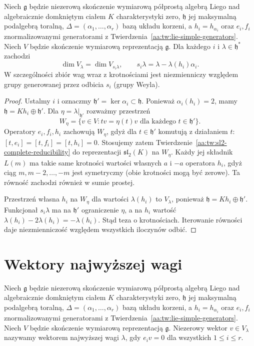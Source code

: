\begin{twierdzenie}
\label{aa:tw:lie-weight-reflection}
Niech $\mathfrak g$ będzie niezerową skończenie wymiarową półprostą algebrą Liego nad algebraicznie domkniętym ciałem $K$ charakterystyki zero, $\mathfrak h$ jej maksymalną podalgebrą toralną, $\Delta=(\alpha_1,\ldots,\alpha_r)$ bazą układu korzeni, a $h_i=h_{\alpha_i}$ oraz $e_i,f_i$ znormalizowanymi generatorami z Twierdzenia~\ref{aa:tw:lie-simple-generators}. Niech $V$ będzie skończenie wymiarową reprezentacją $\mathfrak g$. Dla każdego $i$ i $\lambda\in\mathfrak h^*$ zachodzi
\[
 \dim V_\lambda=\dim V_{s_i\lambda},
 \qquad s_i\lambda=\lambda-\lambda(h_i)\alpha_i.
\]
W szczególności zbiór wag wraz z krotnościami jest niezmienniczy względem grupy generowanej przez odbicia $s_i$ (grupy Weyla).
\end{twierdzenie}
\begin{proof}
Ustalmy $i$ i oznaczmy $\mathfrak h'=\ker\alpha_i\subset\mathfrak h$. Ponieważ $\alpha_i(h_i)=2$, mamy $\mathfrak h=Kh_i\oplus\mathfrak h'$. Dla $\eta=\lambda|_{\mathfrak h'}$ rozważmy przestrzeń
\[
 W_\eta=\{v\in V:tv=\eta(t)v\text{ dla każdego }t\in\mathfrak h'\}.
\]
Operatory $e_i,f_i,h_i$ zachowują $W_\eta$, gdyż dla $t\in\mathfrak h'$ komutują z działaniem $t$: $[t,e_i]=[t,f_i]=[t,h_i]=0$. Stosujemy zatem Twierdzenie~\ref{aa:tw:sl2-complete-reducibility} do reprezentacji $\mathfrak{sl}_2(K)$ na $W_\eta$. Każdy jej składnik $L(m)$ ma takie same krotności wartości własnych $a$ i $-a$ operatora $h_i$, gdyż ciąg $m,m-2,\ldots,-m$ jest symetryczny (obie krotności mogą być zerowe). Ta równość zachodzi również w sumie prostej.

Przestrzeń własna $h_i$ na $W_\eta$ dla wartości $\lambda(h_i)$ to $V_\lambda$, ponieważ $\mathfrak h=Kh_i\oplus\mathfrak h'$. Funkcjonał $s_i\lambda$ ma na $\mathfrak h'$ ograniczenie $\eta$, a na $h_i$ wartość $\lambda(h_i)-2\lambda(h_i)=-\lambda(h_i)$. Stąd teza o krotnościach. Iterowanie równości daje niezmienniczość względem wszystkich iloczynów odbić.
\end{proof}

\section{Wektory najwyższej wagi}

\begin{definicja}
\label{aa:def:lie-highest-vector}
Niech $\mathfrak g$ będzie niezerową skończenie wymiarową półprostą algebrą Liego nad algebraicznie domkniętym ciałem $K$ charakterystyki zero, $\mathfrak h$ jej maksymalną podalgebrą toralną, $\Delta=(\alpha_1,\ldots,\alpha_r)$ bazą układu korzeni, a $h_i=h_{\alpha_i}$ oraz $e_i,f_i$ znormalizowanymi generatorami z Twierdzenia~\ref{aa:tw:lie-simple-generators}. Niech $V$ będzie skończenie wymiarową reprezentacją $\mathfrak g$. Niezerowy wektor $v\in V_\lambda$ nazywamy wektorem najwyższej wagi $\lambda$, gdy $e_i v=0$ dla wszystkich $1\le i\le r$.
\end{definicja}

